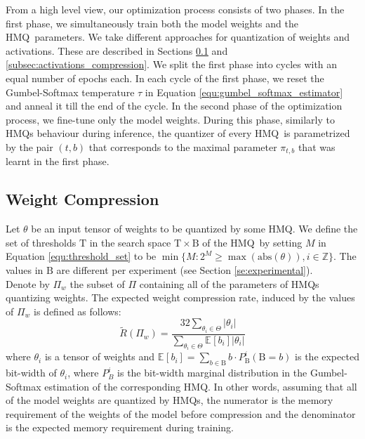\documentclass{article}
\newcommand{\expectation}[2]{\mathbb{E}_{#2}\left[#1\right]}
\newcommand{\bitset}{\mathrm{B}}
\newcommand{\threshset}{\mathrm{T}}
\newcommand{\qb}{HMQ}
\begin{document}
From a high level view, our optimization process consists of two phases.
In the first phase, we simultaneously train both the model weights and the \qb\ parameters.
We take different approaches for quantization of weights and activations.
These are described in Sections \ref{subsec:weight_compression} and \ref{subsec:activations_compression}.
We split the first phase into cycles with an equal number of epochs each.
In each cycle of the first phase, we reset the Gumbel-Softmax temperature $\tau$ in Equation \ref{equ:gumbel_softmax_estimator} and anneal it till the end of the cycle. 
In the second phase of the optimization process, we fine-tune only the model weights. 
During this phase, similarly to \qb s behaviour during inference, the quantizer of every \qb\ is parametrized by the pair $(t, b)$ that corresponds to the maximal parameter $\pi_{t, b}$ that was learnt in the first phase.






\subsection{Weight Compression}\label{subsec:weight_compression}
Let $\theta$ be an input tensor of weights to be quantized by some \qb.
We define the set of thresholds $\threshset$ in the search space $\threshset\times \bitset$ of the \qb\ by setting $M$ in Equation \ref{equ:threshold_set} to be $\min\{M:2^M\geq \max(\mathrm{abs}(\theta)), i\in\mathbb{Z}\}$.
The values in $\bitset$ are different per experiment (see Section \ref{se:experimental}).\\

Denote by $\Pi_w$ the subset of $\Pi$ containing all of the parameters of \qb s quantizing weights.
The expected weight compression rate, induced by the values of $\Pi_w$ is defined as follows:
\begin{equation}\label{equ:compression_rate}
\tilde{R}(\Pi_w)=\frac{32\sum_{\theta_i\in \Theta}|\theta_i|}{\sum_{\theta_i\in \Theta}\expectation{b_i}{}|\theta_i|}
\end{equation}
where $\theta_i$ is a tensor of weights and $\expectation{b_i}{}=\sum_{b\in\bitset}b\cdot P^{i}_{\bitset}(\bitset=b)$ is the expected bit-width of $\theta_i$, where $P^{i}_{B}$ is the bit-width marginal distribution in the Gumbel-Softmax estimation of the corresponding \qb.
In other words, assuming that all of the model weights are quantized by \qb s, the numerator is the memory requirement of the weights of the model before compression and the denominator is the expected memory requirement during training.\\
\end{document}
